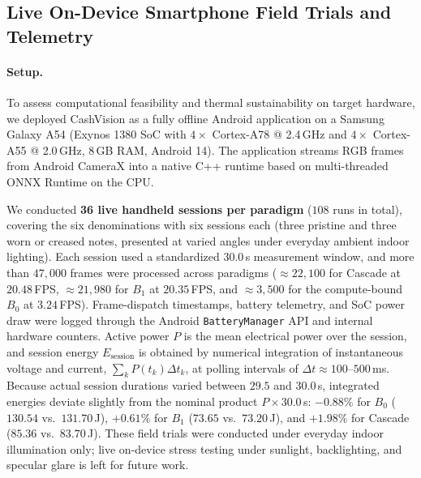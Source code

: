 \documentclass[final,5p,times,twocolumn,authoryear]{elsarticle}
\begin{document}
\subsection{Live On-Device Smartphone Field Trials and Telemetry}
\label{subsec:exp_smartphone_deployment}

\paragraph{Setup.}
To assess computational feasibility and thermal sustainability on target hardware, we deployed CashVision as a fully offline Android application on a Samsung Galaxy A54 (Exynos 1380 SoC with $4\times$ Cortex-A78 @ 2.4\,GHz and $4\times$ Cortex-A55 @ 2.0\,GHz, 8\,GB RAM, Android 14). The application streams RGB frames from Android CameraX into a native C++ runtime based on multi-threaded ONNX Runtime on the CPU.

We conducted \textbf{36 live handheld sessions per paradigm} ($108$ runs in total), covering the six denominations with six sessions each (three pristine and three worn or creased notes, presented at varied angles under everyday ambient indoor lighting). Each session used a standardized $30.0$\,s measurement window, and more than $47{,}000$ frames were processed across paradigms ($\approx 22{,}100$ for Cascade at $20.48$\,FPS, $\approx 21{,}980$ for $B_1$ at $20.35$\,FPS, and $\approx 3{,}500$ for the compute-bound $B_0$ at $3.24$\,FPS). Frame-dispatch timestamps, battery telemetry, and SoC power draw were logged through the Android \texttt{BatteryManager} API and internal hardware counters. Active power $P$ is the mean electrical power over the session, and session energy $E_{\text{session}}$ is obtained by numerical integration of instantaneous voltage and current, $\sum_k P(t_k)\Delta t_k$, at polling intervals of $\Delta t \approx 100$--$500$\,ms. Because actual session durations varied between $29.5$ and $30.0$\,s, integrated energies deviate slightly from the nominal product $P \times 30.0$\,s: $-0.88\%$ for $B_0$ ($130.54$ vs.\ $131.70$\,J), $+0.61\%$ for $B_1$ ($73.65$ vs.\ $73.20$\,J), and $+1.98\%$ for Cascade ($85.36$ vs.\ $83.70$\,J). These field trials were conducted under everyday indoor illumination only; live on-device stress testing under sunlight, backlighting, and specular glare is left for future work.
\end{document}
